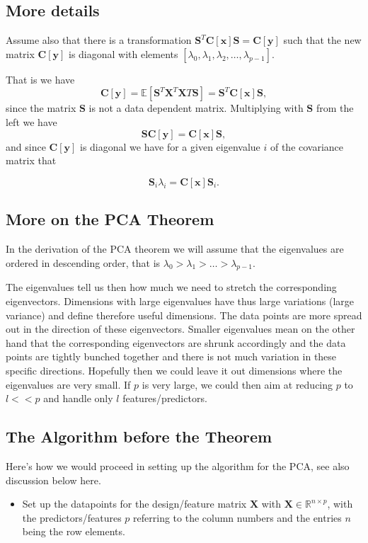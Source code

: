 \documentclass[%
oneside,                 %
final,                   %
10pt]{article}
\begin{document}
\subsection{More details}

Assume also that there is a transformation $\bm{S}^T\bm{C}[\bm{x}]\bm{S}=\bm{C}[\bm{y}]$ such that the new matrix $\bm{C}[\bm{y}]$ is diagonal with elements $[\lambda_0,\lambda_1,\lambda_2,\dots,\lambda_{p-1}]$.  

That is we have
\[
\bm{C}[\bm{y}] = \mathbb{E}[\bm{S}^T\bm{X}^T\bm{X}T\bm{S}]=\bm{S}^T\bm{C}[\bm{x}]\bm{S},
\]
since the matrix $\bm{S}$ is not a data dependent matrix.   Multiplying with $\bm{S}$ from the left we have
\[
\bm{S}\bm{C}[\bm{y}] = \bm{C}[\bm{x}]\bm{S},
\]
and since $\bm{C}[\bm{y}]$ is diagonal we have for a given eigenvalue $i$ of the covariance matrix that

\[
\bm{S}_i\lambda_i = \bm{C}[\bm{x}]\bm{S}_i.
\]

\subsection{More on the PCA Theorem}

In the derivation of the PCA theorem we will assume that the eigenvalues are ordered in descending order, that is
$\lambda_0 > \lambda_1 > \dots > \lambda_{p-1}$. 

The eigenvalues tell us then how much we need to stretch the
corresponding eigenvectors. Dimensions with large eigenvalues have
thus large variations (large variance) and define therefore useful
dimensions. The data points are more spread out in the direction of
these eigenvectors.  Smaller eigenvalues mean on the other hand that
the corresponding eigenvectors are shrunk accordingly and the data
points are tightly bunched together and there is not much variation in
these specific directions. Hopefully then we could leave it out
dimensions where the eigenvalues are very small. If $p$ is very large,
we could then aim at reducing $p$ to $l << p$ and handle only $l$
features/predictors.

\subsection{The Algorithm before the Theorem}

Here's how we would proceed in setting up the algorithm for the PCA, see also discussion below here. 
\begin{itemize}
\item Set up the datapoints for the design/feature matrix $\bm{X}$ with $\bm{X}\in {\mathbb{R}}^{n\times p}$, with the predictors/features $p$  referring to the column numbers and the entries $n$ being the row elements.
\end{itemize}
\end{document}
